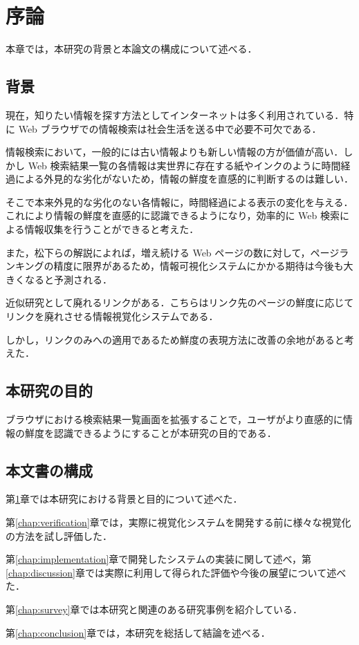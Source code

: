 \chapter{序論}
\label{chap:introduction}

本章では，本研究の背景と本論文の構成について述べる．

\newpage

\section{背景}

現在，知りたい情報を探す方法としてインターネットは多く利用されている．特に Web ブラウザでの情報検索は社会生活を送る中で必要不可欠である．

情報検索において，一般的には古い情報よりも新しい情報の方が価値が高い．しかし Web 検索結果一覧の各情報は実世界に存在する紙やインクのように時間経過による外見的な劣化がないため，情報の鮮度を直感的に判断するのは難しい．

そこで本来外見的な劣化のない各情報に，時間経過による表示の変化を与える．これにより情報の鮮度を直感的に認識できるようになり，効率的に Web 検索による情報収集を行うことができると考えた．

また，松下\cite{tecvisinfo}らの解説によれば，増え続ける Web ページの数に対して，ページランキングの精度に限界があるため，情報可視化システムにかかる期待は今後も大きくなると予測される．

近似研究として廃れるリンク\cite{dyinglink}がある．こちらはリンク先のページの鮮度に応じてリンクを廃れさせる情報視覚化システムである．

しかし，リンクのみへの適用であるため鮮度の表現方法に改善の余地があると考えた．

\section{本研究の目的}

ブラウザにおける検索結果一覧画面を拡張することで，ユーザがより直感的に情報の鮮度を認識できるようにすることが本研究の目的である．

\section{本文書の構成}

第\ref{chap:introduction}章では本研究における背景と目的について述べた．

第\ref{chap:verification}章では，実際に視覚化システムを開発する前に様々な視覚化の方法を試し評価した．

第\ref{chap:implementation}章で開発したシステムの実装に関して述べ，第\ref{chap:discussion}章では実際に利用して得られた評価や今後の展望について述べた．

第\ref{chap:survey}章では本研究と関連のある研究事例を紹介している．

第\ref{chap:conclusion}章では，本研究を総括して結論を述べる．
